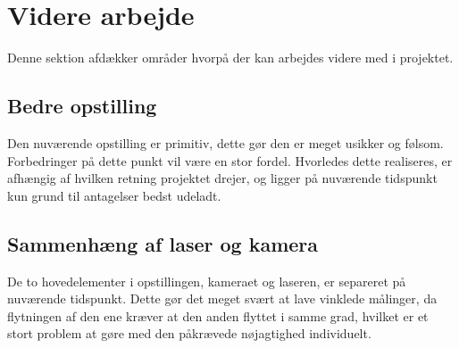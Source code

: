 \section{Videre arbejde}

Denne sektion afdækker områder hvorpå der kan arbejdes videre med i projektet.

\subsection{Bedre opstilling}

Den nuværende opstilling er primitiv, dette gør den er meget usikker og følsom. Forbedringer på dette punkt vil være en stor fordel. Hvorledes dette realiseres, er afhængig af hvilken retning projektet drejer, og ligger på nuværende tidspunkt kun grund til antagelser bedst udeladt.

\subsection{Sammenhæng af laser og kamera}

De to hovedelementer i opstillingen, kameraet og laseren, er separeret på nuværende tidspunkt. Dette gør det meget svært at lave vinklede målinger, da flytningen af den ene kræver at den anden flyttet i samme grad, hvilket er et stort problem at gøre med den påkrævede nøjagtighed individuelt.
